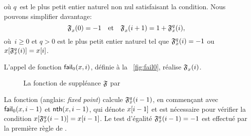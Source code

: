 où \(q\)~est le plus petit entier naturel non nul satisfaisant la
condition. Nous pouvons simplifier davantage:
\begin{equation*}
\mathfrak{F}_{x}^{}(0) = -1
\quad \text{et} \quad
\mathfrak{F}_{x}^{}(i+1) = 1 + \mathfrak{F}_{x}^{q}(i),
\end{equation*}
où~\(i \geqslant 0\) et \(q>0\) est le plus petit entier naturel tel
que \(\mathfrak{F}_{x}^{q}(i) = -1\) ou
\(\smash{{x}[{\mathfrak{F}_{x}^{q}(i)}]} = {x}[{i}]\).


L'appel de fonction
\(\textsf{fail}_0(x,i)\), définie à la
\fig~\vref{fig:fail0}, réalise \(\mathfrak{F}_{x}^{}(i)\).
\begin{figure}[t]
\abovedisplayskip=0pt
\belowdisplayskip=0pt
\caption{La fonction de suppléance \(\mathfrak{F}\) par }
\label{fig:fail0}
\end{figure}
La fonction  (anglais: \emph{fixed
  point}) calcule \(\mathfrak{F}_{x}^{q}(i-1)\), en commençant avec
\(\textsf{fail}_0(x,i-1)\) et
\(\textsf{nth}(x,i-1)\), qui dénote
\({x}[{i-1}]\) et est nécessaire pour vérifier la condition
\(\smash{{x}[{\mathfrak{F}_{x}^{q}(i-1)}]} = {x}[{i-1}]\). Le test
d'égalité \(\mathfrak{F}_{x}^{q}(i-1) = -1\) est effectué par la première
règle de .

